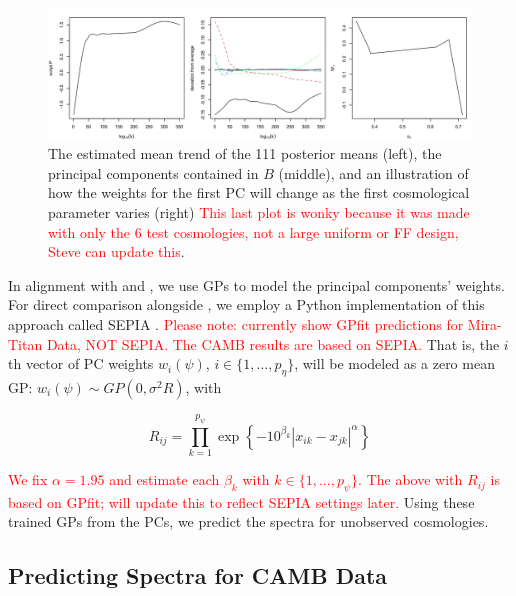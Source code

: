 \documentclass[11pt]{article}
\begin{document}
\begin{figure}
    \centering
    \includegraphics[width=\textwidth]{mean_PCs_oneW.png}
    \caption{The estimated mean trend of the 111 posterior means (left), the principal 
    components contained in $B$ (middle), and an illustration of how the weights 
    for the first PC will change as the first cosmological parameter varies (right) 
    \textcolor{red}{This last plot is wonky because it was made with only the 6 test 
    cosmologies, not a large uniform or FF design, Steve can update this}.}
    \label{fig:mean_PCs_oneW}
\end{figure}



In alignment with \cite{heitmann2009coyote} and \cite{higdon2010estcosmo}, we use 
GPs to model the principal components' weights. For direct comparison alongside
\cite{moran2023mira}, we employ a Python implementation of this approach called 
SEPIA \citep{gattiker2020sepia}. \textcolor{red}{Please note: currently show GPfit 
predictions for Mira-Titan Data, NOT SEPIA. The CAMB results are based on SEPIA.}
That is, the $i$th vector of PC weights $w_i(\psi)$, 
$i \in \{1,\ldots,p_\eta\}$, will be modeled as a zero mean GP: 
$w_i(\psi) \sim GP(0, \sigma^2R)$, with

\begin{equation*}
    R_{ij} = \prod_{k=1}^{p_\psi}\exp\left\{-10^{\beta_k}|x_{ik}-x_{jk}|^\alpha\right\}
\end{equation*}

\textcolor{red}{We fix $\alpha=1.95$ and estimate each $\beta_k$ with $k \in \{1,...,p_\psi\}$. 
The above with $R_{ij}$ is based on GPfit; will update this to reflect SEPIA settings later.}
Using these trained GPs from the PCs, we predict the spectra for unobserved cosmologies.

\subsection{Predicting Spectra for CAMB Data}
\label{subsec:camb_pred}
\end{document}
